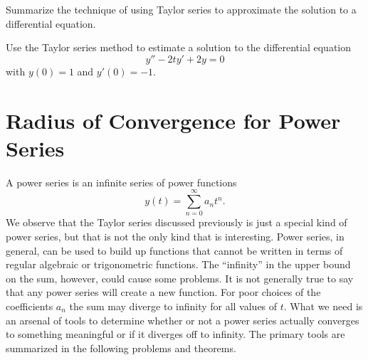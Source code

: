 \begin{problem}
    Summarize the technique of using Taylor series to approximate the solution to a
    differential equation.
\end{problem}

\begin{problem}
    Use the Taylor series method to estimate a solution to the differential equation
    \[ y'' - 2ty' + 2y = 0 \]
    with $y(0) = 1$ and $y'(0)=-1$.
\end{problem}



\section{Radius of Convergence for Power Series}
A power series is an infinite series of power functions
\[ y(t) = \sum_{n=0}^\infty a_n t^n. \]
We observe that the Taylor series discussed previously is just a special kind of power
series, but that is not the only kind that is interesting.  Power series, in general, can
be used to build up functions that cannot be written in terms of regular algebraic or
trigonometric functions.  The ``infinity'' in the upper bound on the sum, however, could
cause some problems.  It is not generally true to say that any power series will create a
new function.  For poor choices of the coefficients $a_n$ the sum may diverge to infinity
for all values of $t$.  What we need is an arsenal of tools to determine whether or not a
power series actually converges to something meaningful or if it diverges off to infinity.
The primary tools are summarized in the following problems and theorems.


